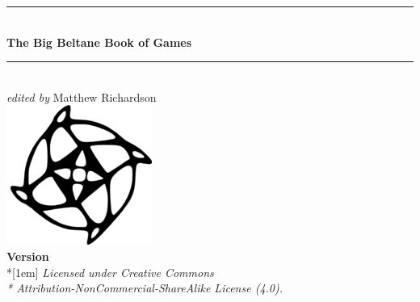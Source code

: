 \begin{titlepage}

\begin{center}


\rule{\linewidth}{0.2em}
\\[1em]
{\huge \bfseries The Big Beltane Book of Games}
\\[1em]
\rule{\linewidth}{0.2em}
\\[1em]
{\large \emph{edited by} Matthew Richardson}
\\[4em]
\includegraphics{bfslogosmall}
\\[4em]
{\large \bfseries Version }
\vfill
{\Large \cc \byncsa}\\*[1em]
\emph{Licensed under Creative Commons\\*
Attribution-NonCommercial-ShareAlike License (4.0).}

\end{center}
\end{titlepage}

